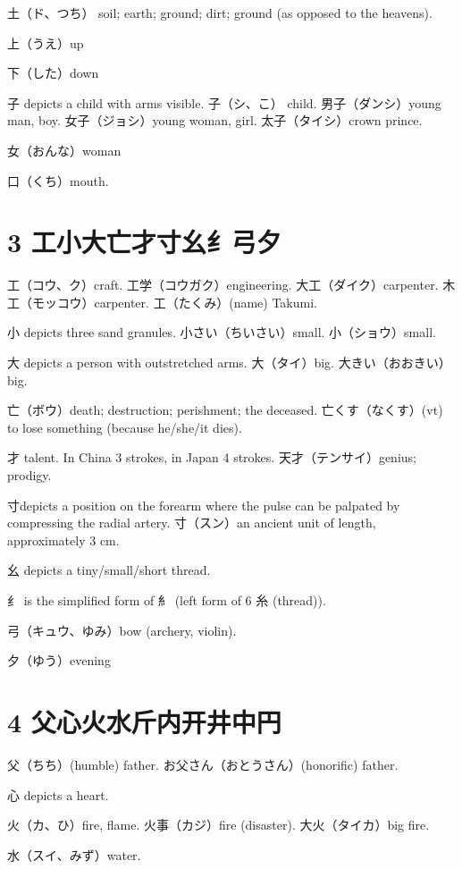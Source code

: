 土（ド、つち）
soil; earth; ground; dirt; ground (as opposed to the heavens).

上（うえ）up

下（した）down

子 depicts a child with arms visible.
子（シ、こ） child.
男子（ダンシ）young man, boy.
女子（ジョシ）young woman, girl.
太子（タイシ）crown prince.

女（おんな）woman

口（くち）mouth.

\section{3 工小大亡才寸幺纟弓夕}

工（コウ、ク）craft.
工学（コウガク）engineering.
大工（ダイク）carpenter.
木工（モッコウ）carpenter.
工（たくみ）(name) Takumi.

小 depicts three sand granules.
小さい（ちいさい）small.
小（ショウ）small.

大 depicts a person with outstretched arms.
大（タイ）big.
大きい（おおきい）big.

亡（ボウ）death; destruction; perishment; the deceased.
亡くす（なくす）(vt) to lose something (because he/she/it dies).

才 talent.
In China 3 strokes, in Japan 4 strokes.
天才（テンサイ）genius; prodigy.

寸depicts a position on the forearm
where the pulse can be palpated by compressing the radial artery.
寸（スン）an ancient unit of length, approximately 3 cm.

幺 depicts a tiny/small/short thread.

纟 is the simplified form of 糹
(left form of 6 糸 (thread)).

弓（キュウ、ゆみ）bow (archery, violin).

夕（ゆう）evening

\section{4 父心火水斤内开井中円}

父（ちち）(humble) father.
お父さん（おとうさん）(honorific) father.

心 depicts a heart.

火（カ、ひ）fire, flame.
火事（カジ）fire (disaster).
大火（タイカ）big fire.

水（スイ、みず）water.

